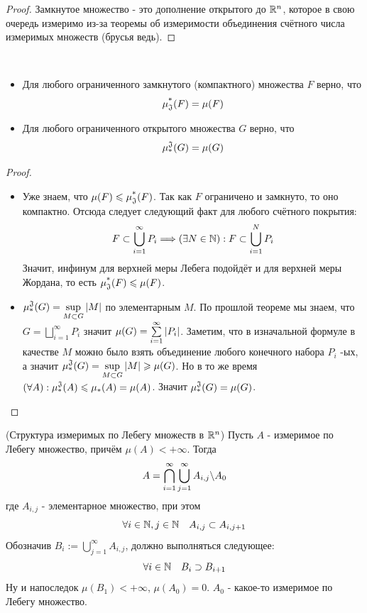 \begin{proof}
	Замкнутое множество - это дополнение открытого до $\mathbb{R}^n$, которое в свою очередь измеримо из-за теоремы об измеримости объединения счётного числа измеримых множеств (брусья ведь).
\end{proof}

\begin{corollary}~
	\begin{itemize}
		\item Для любого ограниченного замкнутого (компактного) множества $F$ верно, что
		\[
			\operatorname{\mu^*_\mathfrak{J}}(F) = \mu(F)
		\]
		
		\item Для любого ограниченного открытого множества $G$ верно, что
		\[
			\operatorname{\mu^\mathfrak{J}_*}(G) = \mu(G)
		\]
	\end{itemize}
\end{corollary}

\begin{proof}~
	\begin{itemize}
		\item Уже знаем, что $\mu(F) \leqslant \operatorname{\mu^*_\mathfrak{J}}(F)$. Так как $F$ ограничено и замкнуто, то оно компактно. Отсюда следует следующий факт для любого счётного покрытия:
		\[
			F \subset \bigcup_{i = 1}^\infty P_i \Longrightarrow (\exists N \in \mathbb{N}) : F \subset \bigcup_{i = 1}^N P_i
		\]
		Значит, инфинум для верхней меры Лебега подойдёт и для верхней меры Жордана, то есть $\operatorname{\mu^*_\mathfrak{J}}(F) \leqslant \mu(F)$.
		
		\item $\operatorname{\mu^\mathfrak{J}_*}(G) = \sup\limits_{M\subset G}|M|$ по элементарным $M$. По прошлой теореме мы знаем, что $G = \bigsqcup\limits_{i=1}^{\infty}P_i$ значит $\mu(G) = \sum\limits_{i=1}^{\infty}|P_i|$. Заметим, что в изначальной формуле в качестве $M$ можно было взять объединение любого конечного набора $P_i$ -ых, а значит $\operatorname{\mu^\mathfrak{J}_*}(G) = \sup\limits_{M\subset G}|M| \geqslant \mu(G)$. Но в то же время $(\forall A) : \operatorname{\mu^\mathfrak{J}_*}(A) \leqslant \mu_*(A) = \mu(A)$. Значит $\operatorname{\mu^\mathfrak{J}_*}(G) = \mu(G)$. 
		
	\end{itemize}
\end{proof}

\begin{theorem} (Структура измеримых по Лебегу множеств в $\mathbb{R}^n$)
	 Пусть $A$ - измеримое по Лебегу множество, причём $\mu(A) < +\infty$. Тогда
	 \[
	 	A = \bigcap_{i = 1}^\infty \bigcup_{j = 1}^\infty A_{i, j} \backslash A_0
	 \]
	 где $A_{i, j}$ - элементарное множество, при этом
	 \[
	 	\forall i \in \mathbb{N}, j \in \mathbb{N} \quad A_{i, j} \subset A_{i, j + 1}
	 \]
	 Обозначив $B_i := \bigcup_{j = 1}^\infty A_{i, j}$, должно выполняться следующее:
	 \[
	 	\forall i \in \mathbb{N} \quad B_i \supset B_{i + 1}
	 \]
	 Ну и напоследок $\mu(B_1) < +\infty$, $\mu(A_0) = 0$. $A_0$ - какое-то измеримое по Лебегу множество.
\end{theorem}


